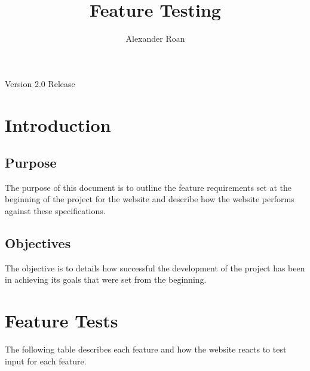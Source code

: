\documentclass[11pt]{article}
\begin{document}
\begin{titlepage}
\title{Feature Testing}
\author{Alexander Roan}
\maketitle
\begin{center}
Version 2.0 Release
\end{center}
\end{titlepage}

\tableofcontents
\newpage
\section{Introduction}
\subsection{Purpose}
The purpose of this document is to outline the feature requirements set at the beginning of the project for the website and describe how the website performs against these specifications.

\subsection{Objectives}
The objective is to details how successful the development of the project has been in achieving its goals that were set from the beginning.

\section{Feature Tests}
The following table describes each feature and how the website reacts to test input for each feature.
\end{document}
